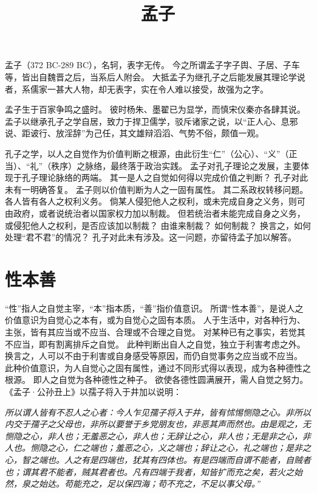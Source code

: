 \documentclass[11pt]{article}
\title{孟子}
\date{}
\begin{document}
  \maketitle
  
  \linenumbers
孟子（372 BC-289 BC），名轲，表字无传。
今之所谓孟子字子舆、子居、子车等，皆出自魏晋之后，当系后人附会。
大抵孟子为继孔子之后能发展其理论学说者，系儒家一甚大人物，却无表字，实在令人难以接受，故强为之字。

\par

孟子生于百家争鸣之盛时。
彼时杨朱、墨翟已为显学，而慎宋仪秦亦各肆其说。
孟子以继承孔子之学自居，致力于捍卫儒学，驳斥诸家之说，以“正人心、息邪说、距诐行、放淫辞”为己任，其文雄辩滔滔、气势不俗，颇值一观。

\par

孔子之学，以人之自觉作为价值判断之根源，由此衍生“仁”（公心）、“义”（正当）、“礼”（秩序）之脉络，最终落于政治实践。
孟子对孔子理论之发展，主要体现于孔子理论脉络的两端。
其一是人之自觉如何得以完成价值之判断？
孔子对此未有一明确答复。
孟子则以价值判断为人之一固有属性。
其二系政权转移问题。
各人皆有各人之权利义务。
倘某人侵犯他人之权利，或未完成自身之义务，则可由政府，或者说统治者以国家权力加以制裁。
但若统治者未能完成自身之义务，或侵犯他人之权利，是否应该加以制裁？
由谁来制裁？
如何制裁？
换言之，如何处理“君不君”的情况？
孔子对此未有涉及。这一问题，亦留待孟子加以解答。
  
\section{性本善}
“性”指人之自觉主宰，“本”指本质，“善”指价值意识。
所谓“性本善”，是说人之价值意识为自觉心之本有，或为自觉心之固有本质。
人于生活中，对各种行为、主张，皆有其应当或不应当、合理或不合理之自觉。
对某种已有之事实，若觉其不应当，即有割离排斥之自觉。
此种判断出自人之自觉，独立于利害考虑之外。
换言之，人可以不由于利害或自身感受等原因，而仍自觉事务之应当或不应当。
此种价值意识，为人自觉心之固有属性，通过不同形式得以表现，成为各种德性之根源。
即人之自觉为各种德性之种子。
欲使各德性圆满展开，需人自觉之努力。
《孟子·公孙丑上》以孺子将入于井加以说明：

\textit{所以谓人皆有不忍人之心者：今人乍见孺子将入于井，皆有怵惕恻隐之心。非所以内交于孺子之父母也，非所以要誉于乡党朋友也，非恶其声而然也。由是观之，无恻隐之心，非人也；无羞恶之心，非人也；无辞让之心，非人也；无是非之心，非人也。恻隐之心，仁之端也；羞恶之心，义之端也；辞让之心，礼之端也；是非之心，智之端也。人之有是四端也，犹其有四体也。有是四端而自谓不能者，自贼者也；谓其君不能者，贼其君者也。凡有四端于我者，知皆扩而充之矣，若火之始然，泉之始达。苟能充之，足以保四海；苟不充之，不足以事父母。”}
\end{document}
